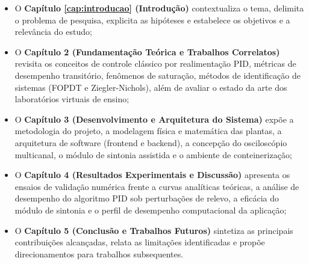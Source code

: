 \begin{itemize}
    \item O \textbf{Capítulo \ref{cap:introducao} (Introdução)} contextualiza o tema, delimita o problema de pesquisa, explicita as hipóteses e estabelece os objetivos e a relevância do estudo;
    \item O \textbf{Capítulo 2 (Fundamentação Teórica e Trabalhos Correlatos)} revisita os conceitos de controle clássico por realimentação PID, métricas de desempenho transitório, fenômenos de saturação, métodos de identificação de sistemas (FOPDT e Ziegler-Nichols), além de avaliar o estado da arte dos laboratórios virtuais de ensino;
    \item O \textbf{Capítulo 3 (Desenvolvimento e Arquitetura do Sistema)} expõe a metodologia do projeto, a modelagem física e matemática das plantas, a arquitetura de software (frontend e backend), a concepção do osciloscópio multicanal, o módulo de sintonia assistida e o ambiente de conteinerização;
    \item O \textbf{Capítulo 4 (Resultados Experimentais e Discussão)} apresenta os ensaios de validação numérica frente a curvas analíticas teóricas, a análise de desempenho do algoritmo PID sob perturbações de relevo, a eficácia do módulo de sintonia e o perfil de desempenho computacional da aplicação;
    \item O \textbf{Capítulo 5 (Conclusão e Trabalhos Futuros)} sintetiza as principais contribuições alcançadas, relata as limitações identificadas e propõe direcionamentos para trabalhos subsequentes.
\end{itemize}
